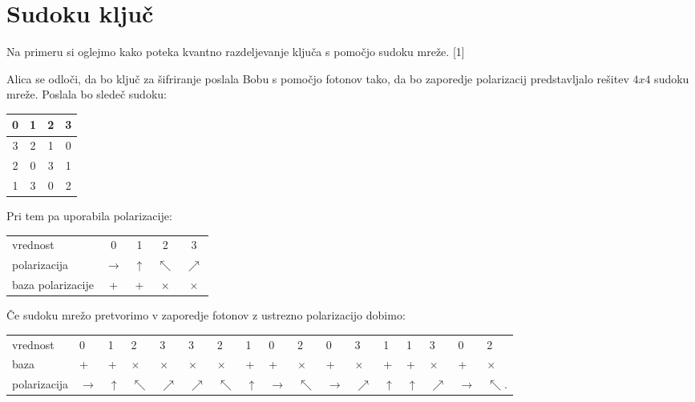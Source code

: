 \documentclass[A4paper, 11pt]{article}
\begin{document}

\section{Sudoku ključ}

Na primeru si oglejmo kako poteka kvantno razdeljevanje ključa s pomočjo sudoku mreže. [1]

Alica se odloči, da bo ključ za šifriranje poslala Bobu s pomočjo fotonov tako, da bo zaporedje polarizacij predstavljalo rešitev $4x4$ sudoku mreže. Poslala bo sledeč sudoku:

\begin{center}
\begin{tabular}{| c | c || c | c |}
\hline
0 & 1 & 2 & 3\\
\hline
3 & 2 & 1 & 0\\
\hline
\hline
2 & 0 & 3 & 1\\
\hline
1 & 3 & 0 & 2\\
\hline
\end{tabular}
\end{center}

Pri tem pa uporabila polarizacije:

\begin{center}
\begin{tabular}{l c c c c}
vrednost & 0 & 1 & 2 & 3\\
polarizacija & $\rightarrow$ & $\uparrow$ & $\nwarrow$ & $\nearrow$\\
baza polarizacije & + & + & $\times$ & $\times$\\
\end{tabular}
\end{center}

Če sudoku mrežo pretvorimo v zaporedje fotonov z ustrezno polarizacijo dobimo:

\begin{center}
\begin{tabular}{l m{0.2 cm} m{0.2 cm} m{0.2 cm} m{0.2 cm} m{0.2 cm} m{0.2 cm} m{0.2 cm} m{0.2 cm} m{0.2 cm} m{0.2 cm} m{0.2 cm} m{0.2 cm} m{0.2 cm} m{0.2 cm} m{0.2 cm} m{0.2 cm}}
vrednost & 0 & 1 & 2 & 3 & 3 & 2 & 1 & 0 & 2 & 0 & 3 & 1 & 1 & 3 & 0 & 2\\
baza & + & + & $\times$ & $\times$ & $\times$ & $\times$ & + & + & $\times$ & + & $\times$ & + & + & $\times$ & + & $\times$\\
polarizacija & $\rightarrow$ & $\uparrow$ & $\nwarrow$ & $\nearrow$ & $\nearrow$ & $\nwarrow$ & $\uparrow$ & $\rightarrow$ & $\nwarrow$ & $\rightarrow$ & $\nearrow$ & $\uparrow$ & $\uparrow$ & $\nearrow$ & $\rightarrow$ & $\nwarrow$.
\end{tabular}
\end{center}
\end{document}
